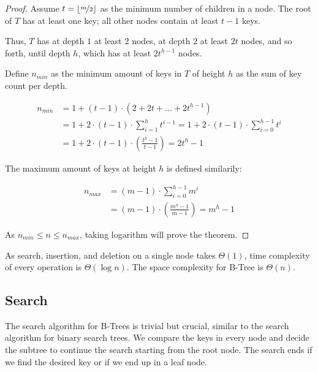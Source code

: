 \begin{proof}
  Assume $t = \lfloor\nicefrac{m}{2}\rfloor$ as the minimum number of children in a node. The root of $T$ has at least one key; all other nodes contain at least $t - 1$ keys.

  Thus, $T$ has at depth $1$ at least $2$ nodes, at depth $2$ at least $2t$ nodes, and so forth, until depth $h$, which has at least $2t^{h-1}$ nodes.

  Define $n_{min}$ as the minimum amount of keys in $T$ of height $h$ as the sum of key count per depth.

  \begin{equation}
    \begin{split}
      n_{min} & = 1 + (t - 1) \cdot (2 + 2t + \dots + 2t^{h-1}) \\
      &= 1 + 2 \cdot (t - 1) \cdot \sum^{h}_{i = 1}{t^{i-1}} = 1 + 2 \cdot (t - 1) \cdot \sum^{h - 1}_{i = 0}{t^{i}} \\
      &= 1 + 2 \cdot (t - 1) \cdot (\frac{t^h - 1}{t - 1}) = 2t^h - 1
    \end{split}
  \end{equation}

  The maximum amount of keys at height $h$ is defined similarily:

  \begin{equation}
    \begin{split}
      n_{max} & = (m - 1) \cdot \sum^{h - 1}_{i = 0}{m^i} \\
      &= (m - 1) \cdot (\frac{m^h - 1}{m - 1}) = m^h - 1
    \end{split}
  \end{equation}

  As $n_{min} \le n \le n_{max}$, taking logarithm will prove the theorem.
\end{proof}

As search, insertion, and deletion on a single node takes $\Theta{(1)}$, time complexity of every operation is $\Theta{(\log{n})}$. The space complexity for B-Tree is $\Theta{(n)}$.


\subsection{Search}

The search algorithm for B-Trees is trivial but crucial, similar to the search algorithm for binary search trees. We compare the keys in every node and decide the subtree to continue the search starting from the root node. The search ends if we find the desired key or if we end up in a leaf node.


